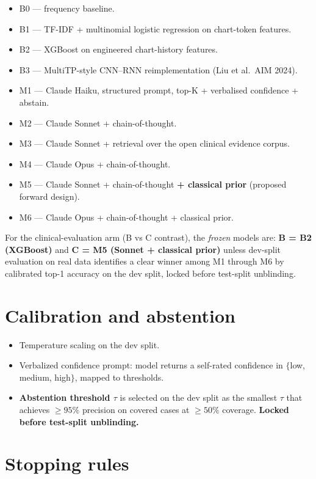 \documentclass[11pt,letterpaper]{article}
\begin{document}
\begin{itemize}
    \item B0 --- frequency baseline.
    \item B1 --- TF-IDF + multinomial logistic regression on chart-token features.
    \item B2 --- XGBoost on engineered chart-history features.
    \item B3 --- MultiTP-style CNN--RNN reimplementation (Liu et al.\ AIM 2024).
    \item M1 --- Claude Haiku, structured prompt, top-K + verbalised confidence + abstain.
    \item M2 --- Claude Sonnet + chain-of-thought.
    \item M3 --- Claude Sonnet + retrieval over the open clinical evidence corpus.
    \item M4 --- Claude Opus + chain-of-thought.
    \item M5 --- Claude Sonnet + chain-of-thought \textbf{+ classical prior} (proposed forward design).
    \item M6 --- Claude Opus + chain-of-thought + classical prior.
\end{itemize}

For the clinical-evaluation arm (B vs C contrast), the \textit{frozen} models
are: \textbf{B = B2 (XGBoost)} and \textbf{C = M5 (Sonnet + classical prior)}
unless dev-split evaluation on real data identifies a clear winner among M1
through M6 by calibrated top-1 accuracy on the dev split, locked before
test-split unblinding.

\section{Calibration and abstention}

\begin{itemize}
    \item Temperature scaling on the dev split.
    \item Verbalized confidence prompt: model returns a self-rated confidence
    in $\{$low, medium, high$\}$, mapped to thresholds.
    \item \textbf{Abstention threshold $\tau$} is selected on the dev split as
    the smallest $\tau$ that achieves $\geq 95\%$ precision on covered cases
    at $\geq 50\%$ coverage. \textbf{Locked before test-split unblinding.}
\end{itemize}

\section{Stopping rules}
\end{document}
